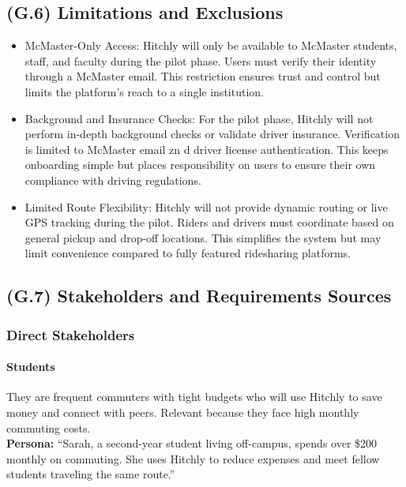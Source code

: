 \documentclass[12pt,letterpaper]{article}
\begin{document}
\subsection{(G.6) Limitations and Exclusions}
\begin{itemize}
  \item McMaster-Only Access: Hitchly will only be available to McMaster students, staff, and faculty during the pilot phase. Users must verify their identity through a McMaster email. This restriction ensures trust and control but limits the platform’s reach to a single institution. 

  \item Background and Insurance Checks: For the pilot phase, Hitchly will not perform in-depth background checks or validate driver insurance. Verification is limited to McMaster email zn d driver license authentication. This keeps onboarding simple but places responsibility on users to ensure their own compliance with driving regulations.

  \item Limited Route Flexibility: Hitchly will not provide dynamic routing or live GPS tracking during the pilot. Riders and drivers must coordinate based on general pickup and drop-off locations. This simplifies the system but may limit convenience compared to fully featured ridesharing platforms. 
\end{itemize}


\subsection{(G.7) Stakeholders and Requirements Sources}

\subsubsection*{Direct Stakeholders}

\paragraph{Students}
They are frequent commuters with tight budgets who will use Hitchly to save money and connect with peers. 
Relevant because they face high monthly commuting costs.\\
\textbf{Persona:} ``Sarah, a second-year student living off-campus, spends over \$200 monthly on commuting. She uses Hitchly to reduce expenses and meet fellow students traveling the same route.''
\end{document}

